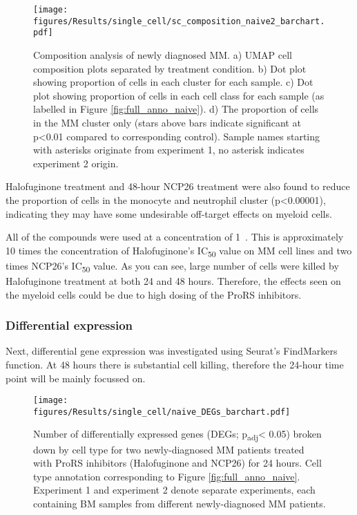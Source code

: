 \begin{figure}[htb]
\centering
\texttt{[image: figures/Results/single\_cell/sc\_composition\_naive2\_barchart.pdf]}
\caption[scRNA-seq composition analysis- newly diagnosed MM]{Composition analysis of newly diagnosed MM.
    a) UMAP cell composition plots separated by treatment condition.
    b) Dot plot showing proportion of cells in each cluster for each sample.
    c) Dot plot showing proportion of cells in each cell class for each sample (as labelled in Figure \ref{fig:full_anno_naive}).
    d) The proportion of cells in the MM cluster only (stars above bars indicate significant at p<0.01 compared to corresponding control).
    Sample names starting with asterisks originate from experiment 1, no asterisk indicates experiment 2 origin.}
\label{fig:composition_naive}
\end{figure}

Halofuginone treatment and 48-hour NCP26 treatment were also found to reduce the proportion of cells in the monocyte and neutrophil cluster (p<0.00001), indicating they may have some undesirable off-target effects on myeloid cells.

All of the compounds were used at a concentration of 1\si{\micro\Molar}.
This is approximately 10 times the concentration of Halofuginone's IC\textsubscript{50} value on MM cell lines and two times NCP26's IC\textsubscript{50} value.
As you can see, large number of cells were killed by Halofuginone treatment at both 24 and 48 hours.
Therefore, the effects seen on the myeloid cells could be due to high dosing of the ProRS inhibitors.

\subsubsection{Differential expression}
Next, differential gene expression was investigated using Seurat's FindMarkers function.
At 48 hours there is substantial cell killing, therefore the 24-hour time point will be mainly focussed on.
%
\begin{figure}[htb]
\centering
\texttt{[image: figures/Results/single\_cell/naive\_DEGs\_barchart.pdf]}
\caption[scRNA-seq DEGs per cell type- newly-diagnosed MM]{Number of differentially expressed genes (DEGs; p\textsubscript{adj}< 0.05) broken down by cell type for two newly-diagnosed MM patients treated with ProRS inhibitors (Halofuginone and NCP26) for 24 hours.
Cell type annotation corresponding to Figure \ref{fig:full_anno_naive}.
Experiment 1 and experiment 2 denote separate experiments, each containing BM samples from different newly-diagnosed MM patients.}
\label{fig:naive_deg_bar}
\end{figure}


